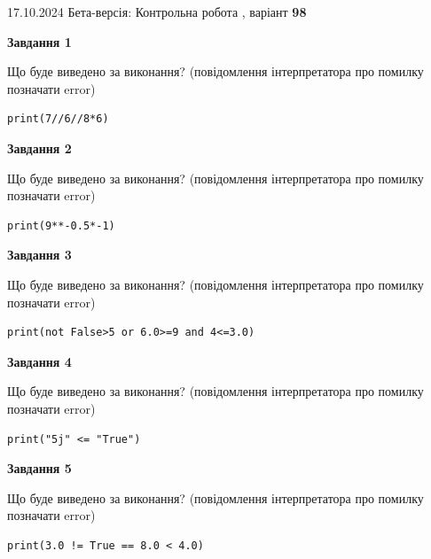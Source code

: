 \documentclass[12pt, ukrainian]{article}
\begin{document}
{\Large{17.10.2024 Бета-версія: Контрольна робота , варіант  \No \textbf { 98 }\par}}
{
\begin {large}
{\begin {center}\textbf{Завдання 1}\end {center}}

Що буде виведено за виконання? (повідомлення інтерпретатора про помилку позначати error)\par
\begin{verbatim}
print(7//6//8*6)
\end{verbatim}

{\begin {center}\textbf{Завдання 2}\end {center}}

Що буде виведено за виконання? (повідомлення інтерпретатора про помилку позначати error)\par
\begin{verbatim}
print(9**-0.5*-1)
\end{verbatim}

{\begin {center}\textbf{Завдання 3}\end {center}}

Що буде виведено за виконання? (повідомлення інтерпретатора про помилку позначати error)\par
\begin{verbatim}
print(not False>5 or 6.0>=9 and 4<=3.0)
\end{verbatim}

{\begin {center}\textbf{Завдання 4}\end {center}}

Що буде виведено за виконання? (повідомлення інтерпретатора про помилку позначати error)\par
\begin{verbatim}
print("5j" <= "True")
\end{verbatim}

{\begin {center}\textbf{Завдання 5}\end {center}}

Що буде виведено за виконання? (повідомлення інтерпретатора про помилку позначати error)\par
\begin{verbatim}
print(3.0 != True == 8.0 < 4.0)
\end{verbatim}


\end{large}}
\end{document}
